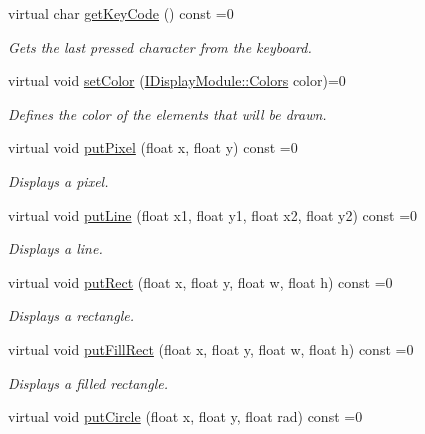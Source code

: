 \begin{DoxyCompactItemize}
virtual char \mbox{\hyperlink{classArcade_1_1Display_1_1IDisplayModule_a403f8a0f065dad707a881ef3cee79805}{get\+Key\+Code}} () const =0
\begin{DoxyCompactList}\small\item\em Gets the last pressed character from the keyboard. \end{DoxyCompactList}\item 
virtual void \mbox{\hyperlink{classArcade_1_1Display_1_1IDisplayModule_a9f81148f93a249d6fc91307819911b4e}{set\+Color}} (\mbox{\hyperlink{classArcade_1_1Display_1_1IDisplayModule_ae0a776be9163d096051c522e21c007b2}{I\+Display\+Module\+::\+Colors}} color)=0
\begin{DoxyCompactList}\small\item\em Defines the color of the elements that will be drawn. \end{DoxyCompactList}\item 
virtual void \mbox{\hyperlink{classArcade_1_1Display_1_1IDisplayModule_a86a61eaa1d0cf2ddfdedbaa04054da90}{put\+Pixel}} (float x, float y) const =0
\begin{DoxyCompactList}\small\item\em Displays a pixel. \end{DoxyCompactList}\item 
virtual void \mbox{\hyperlink{classArcade_1_1Display_1_1IDisplayModule_a669da8dd0fc5360d11c735d68c17bc6e}{put\+Line}} (float x1, float y1, float x2, float y2) const =0
\begin{DoxyCompactList}\small\item\em Displays a line. \end{DoxyCompactList}\item 
virtual void \mbox{\hyperlink{classArcade_1_1Display_1_1IDisplayModule_a4c4072d7444006b9a0ba134c684e58b5}{put\+Rect}} (float x, float y, float w, float h) const =0
\begin{DoxyCompactList}\small\item\em Displays a rectangle. \end{DoxyCompactList}\item 
virtual void \mbox{\hyperlink{classArcade_1_1Display_1_1IDisplayModule_a1e9f08e3568ac005e92191eea6c0ae4d}{put\+Fill\+Rect}} (float x, float y, float w, float h) const =0
\begin{DoxyCompactList}\small\item\em Displays a filled rectangle. \end{DoxyCompactList}\item 
virtual void \mbox{\hyperlink{classArcade_1_1Display_1_1IDisplayModule_a68b7b140a378dc416ec278d97dc76e9e}{put\+Circle}} (float x, float y, float rad) const =0

\end{DoxyCompactItemize}
